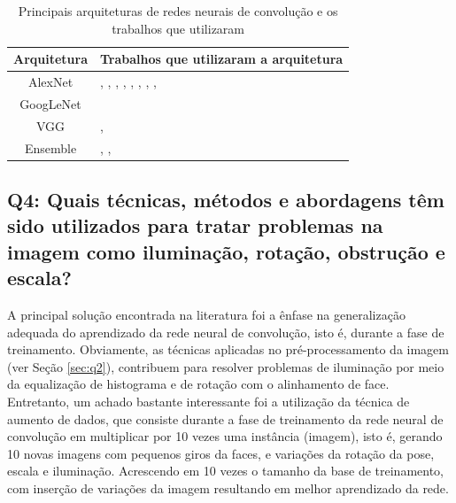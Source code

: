 \begin{table}[]\footnotesize
\centering
\begin{tabular}{|c|L|}
\hline
\textbf{Arquitetura} & \textbf{Trabalhos que utilizaram a arquitetura}                                                                                    \\ \hline
AlexNet              & \cite{art1}, \cite{art2}, \cite{art4}, \cite{art7}, \cite{art9}, \cite{art11}, \cite{art13}, \cite{art14}, \cite{art15} \\ \hline
GoogLeNet            & \cite{art10}                                                                                            \\ \hline
VGG                  & \cite{art8}, \cite{art13}                                                                                 \\ \hline
Ensemble             & \cite{art3}, \cite{art5}, \cite{art6}                                                                       \\ \hline
\end{tabular}

\caption{Principais arquiteturas de redes neurais de convolução e os trabalhos que utilizaram}
\label{arquiteturas}

\end{table}

\subsection{Q4: Quais técnicas, métodos e abordagens têm sido utilizados para tratar problemas na imagem como iluminação, rotação, obstrução e escala?}
A principal solução encontrada na literatura foi a ênfase na generalização adequada do aprendizado da rede neural de convolução, isto é, durante a fase de treinamento. Obviamente, as técnicas aplicadas no pré-processamento da imagem (ver Seção \ref{sec:q2}), contribuem para resolver problemas de iluminação por meio da equalização de histograma e de rotação com o alinhamento de face. Entretanto, um achado bastante interessante foi a utilização da técnica de aumento de dados, que consiste durante a fase de treinamento da rede neural de convolução em multiplicar por 10 vezes uma instância (imagem), isto é, gerando 10 novas imagens com pequenos giros da faces, e variações da rotação da pose, escala e iluminação. Acrescendo em 10 vezes o tamanho da base de treinamento, com inserção de variações da imagem resultando em melhor aprendizado da rede.

